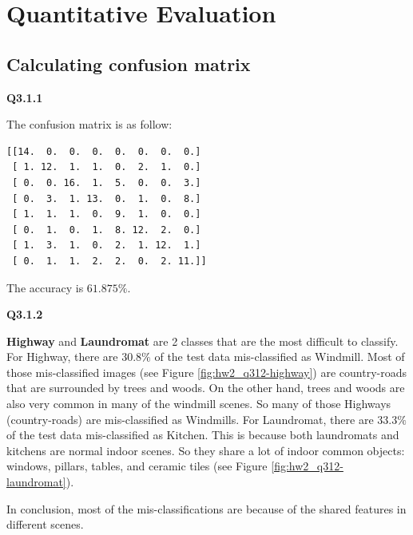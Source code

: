 \documentclass[
  course = {{16-720B Computer Vision}},
  quartile = {{1}},
  assignment = 2-Bag\ of \ Visual\ Words,
  name = {{Kangle Deng}},
  email = {{kangled@andrew.cmu.edu}},
  firstexercise = 1
]{aga-homework}
\begin{document}
\section{Quantitative Evaluation}
\subsection{Calculating confusion matrix}
\noindent \textbf{Q3.1.1}

The confusion matrix is as follow:
\begin{verbatim}
[[14.  0.  0.  0.  0.  0.  0.  0.]
 [ 1. 12.  1.  1.  0.  2.  1.  0.]
 [ 0.  0. 16.  1.  5.  0.  0.  3.]
 [ 0.  3.  1. 13.  0.  1.  0.  8.]
 [ 1.  1.  1.  0.  9.  1.  0.  0.]
 [ 0.  1.  0.  1.  8. 12.  2.  0.]
 [ 1.  3.  1.  0.  2.  1. 12.  1.]
 [ 0.  1.  1.  2.  2.  0.  2. 11.]]
\end{verbatim}

The accuracy is $61.875\%$.

\noindent \textbf{Q3.1.2}

\textbf{Highway} and \textbf{Laundromat} are 2 classes that are the most difficult to classify. For Highway, there are $30.8\%$ of the test data mis-classified as Windmill. Most of those mis-classified images (see Figure \ref{fig:hw2_q312-highway}) are country-roads that are surrounded by trees and woods. On the other hand, trees and woods are also very common in many of the windmill scenes. So many of those Highways (country-roads) are mis-classified as Windmills. For Laundromat, there are $33.3\%$ of the test data mis-classified as Kitchen. This is because both laundromats and kitchens are normal indoor scenes. So they share a lot of indoor common objects: windows, pillars, tables, and 
ceramic tiles (see Figure \ref{fig:hw2_q312-laundromat}).

In conclusion, most of the mis-classifications are because of the shared features in different scenes.
\end{document}
